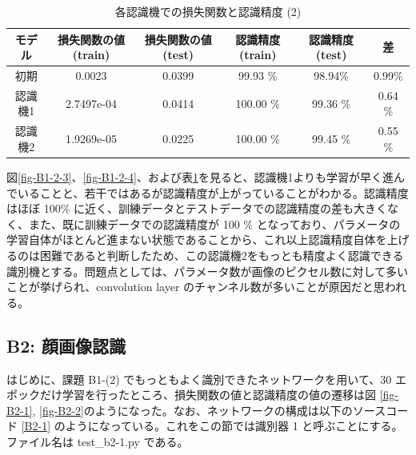 \documentclass[a4paper,dvipdfmx]{jsarticle}
\begin{document}
\begin{table}[H]
\begin{center}
\caption{各認識機での損失関数と認識精度 (2)}
  \begin{tabular}{|c|c|c||c|c|c|} \hline
    モデル & 損失関数の値(train) & 損失関数の値(test) & 認識精度(train) & 認識精度(test) & 差 \\ \hline \hline
    初期 & 0.0023 & 0.0399 & 99.93 \% & 98.94\% & 0.99\% \\ \hline
    認識機1 & 2.7497e-04 & 0.0414 & 100.00 \% & 99.36 \% & 0.64 \% \\ \hline 
    認識機2 & 1.9269e-05 & 0.0225 & 100.00 \% & 99.45 \% & 0.55 \% \\ \hline
  \end{tabular}
	\label{tableB1-2-2}
\end{center}
\end{table}

図\ref{fig-B1-2-3}、\ref{fig-B1-2-4}、および表\ref{tableB1-2-2}を見ると、認識機1よりも学習が早く進んでいることと、若干ではあるが認識精度が上がっていることがわかる。認識精度はほぼ 100\% に近く、訓練データとテストデータでの認識精度の差も大きくなく、また、既に訓練データでの認識精度が 100 \% となっており、パラメータの学習自体がほとんど進まない状態であることから、これ以上認識精度自体を上げるのは困難であると判断したため、この認識機2をもっとも精度よく認識できる識別機とする。問題点としては、パラメータ数が画像のピクセル数に対して多いことが挙げられ、convolution layer のチャンネル数が多いことが原因だと思われる。

\subsection*{B2: 顔画像認識}

はじめに、課題 B1-(2) でもっともよく識別できたネットワークを用いて、30 エポックだけ学習を行ったところ、損失関数の値と認識精度の値の遷移は図 \ref{fig-B2-1}, \ref{fig-B2-2}のようになった。なお、ネットワークの構成は以下のソースコード \ref{B2-1} のようになっている。これをこの節では識別器 1 と呼ぶことにする。ファイル名は test\_b2-1.py である。
\end{document}
